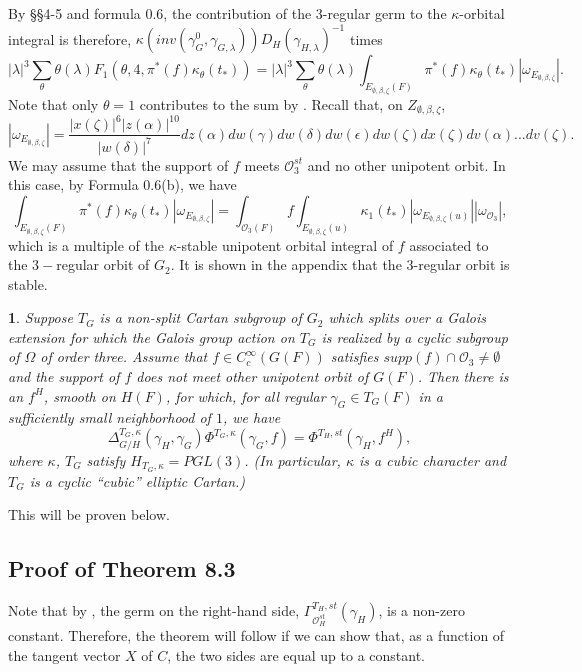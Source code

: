 \documentclass[12pt,letterpaper]{amsart}
\newcommand{\eps}{\epsilon}
\newcommand{\proclaimname}{}
\newtheorem*{proclaimx}{\proclaimname}
\newenvironment{proclaim}[1]%
  {\renewcommand{\proclaimname}{#1}\begin{proclaimx}}{\end{proclaimx}}
\begin{document}
By \S\S 4-5 and formula 0.6, the contribution of the
3-regular germ to the $\kappa$-orbital
integral is therefore,
$\kappa(inv(\gamma_G^0,\gamma_{G,\lambda}))D_H(\gamma_{H,\lambda})^{-1}$ times
\[
|\lambda|^3\sum_{\theta}\theta(\lambda)
F_1(\theta,4,\pi^*(f)\kappa_\theta(t_*))=
|\lambda|^3\sum_{\theta}\theta(\lambda)
\int_{E_{\emptyset,\beta,\zeta}(F)}\pi^*(f)\kappa_\theta(t_*)
|\omega_{E_{\emptyset,\beta,\zeta}}|.
\]
Note that only $\theta =1$ contributes to the sum by \cite[ch 6, \S 2]{Ha92a}.
Recall that, on $Z_{\emptyset,\beta,\zeta}$,
\[
|\omega_{E_{\emptyset,\beta,\zeta}}|
=\frac{|x(\zeta)|^6|z(\alpha)|^{10}}{{|w(\delta)|^7}}
dz(\alpha)dw(\gamma)dw(\delta)dw(\eps)dw(\zeta)dx(\zeta)
dv(\alpha)...dv(\zeta).
\]
We may assume that the support of $f$ meets ${\mathcal O}_3^{st}$ and no other
unipotent orbit. In this case, by Formula 0.6(b), we have
\[
\int_{E_{\emptyset,\beta,\zeta}(F)}\pi^*(f)\kappa_\theta(t_*)
|\omega_{E_{\emptyset,\beta,\zeta}}|
=\int_{{\mathcal O}_3(F)}f
\int_{E_{\emptyset,\beta,\zeta}(u)}\kappa_1(t_*)
|\omega_{E_{\emptyset,\beta,\zeta}(u)}||\omega_{{\mathcal O}_3}|,
\tag{8.2}
\]
which is a multiple of the $\kappa$-stable unipotent
orbital integral of $f$ associated to the $3-$regular orbit
of $G_2$. It is shown in the appendix that the $3$-regular orbit is stable.

\begin{proclaim}{Theorem 8.3} Suppose $T_G$ is a non-split Cartan subgroup
of $G_2$ which splits over a
Galois extension for which the Galois group action on $T_G$
is realized by a cyclic subgroup of $\Omega$ of order three.
Assume that $f\in C_c^\infty(G(F))$ satisfies $supp(f)\cap {\mathcal O}_3
\not= \emptyset$ and the support of $f$ does not meet other unipotent orbit
of $G(F)$. Then there is an $f^H$, smooth on
$H(F)$, for which, for all regular $\gamma_G\in T_G(F)$
in a sufficiently small neighborhood of $1$, we have
\[
\Delta_{G/H}^{T_G,\kappa}(\gamma_H,\gamma_G)
\Phi^{T_G,\kappa}(\gamma_G,f)=
\Phi^{T_H,st}(\gamma_H,f^H),
\]
where $\kappa$, $T_G$ satisfy $H_{T_G,\kappa}=PGL(3)$.
(In particular, $\kappa$ is a cubic character and $T_G$ is a cyclic
``cubic'' elliptic Cartan.)
\end{proclaim}

This will be proven below.

\subsection*{Proof of Theorem 8.3}

Note that by \cite{Ro80}, the germ on the
right-hand side, $\Gamma_{{\mathcal O}_H^{st}}^{T_H,st}(\gamma_H)$, is a
non-zero constant. Therefore, the theorem will follow if we can show that,
as a function of the tangent vector $X$ of $C$,
the two sides are equal up to a constant.
\end{document}
